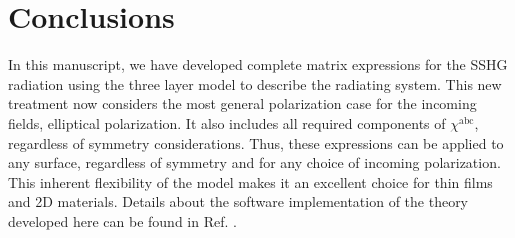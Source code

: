 \documentclass[aps,pra,10pt,amsmath,twocolumn,letterpaper]{revtex4-1}
\begin{document}

\section{Conclusions}

In this manuscript, we have developed complete matrix expressions for the SSHG
radiation using the three layer model to describe the radiating system. This new
treatment now considers the most general polarization case for the incoming
fields, elliptical polarization. It also includes all required components of
$\chi^{\mathrm{abc}}$, regardless of symmetry considerations. Thus, these
expressions can be applied to any surface, regardless of symmetry and for any
choice of incoming polarization. This inherent flexibility of the model makes it
an excellent choice for thin films and 2D materials. Details about the software
implementation of the theory developed here can be found in Ref.
\cite{andersonJOSS17}.


\end{document}
